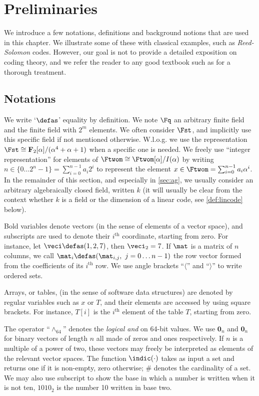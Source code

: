 \section{Preliminaries}
\label{not}

We introduce a few notations, definitions and background notions that are used in this chapter. We illustrate some of these with classical examples, such as \emph{Reed-Solomon} codes. However,
our goal is not to provide a detailed exposition on coding theory, and we refer the reader to any good textbook such as \cite{vanlint} for a thorough treatment.

\subsection{Notations}
We write `$\defas$' equality by definition.
We note $\Fq$ an arbitrary finite field and \Ftwom the finite field with $2^m$ elements. We often consider $\Fst$, and implicitly use this specific field if not mentioned otherwise.
W.l.o.g. we use the representation
$\Fst \cong \mathbf{F}_2[\alpha]/(\alpha^4 + \alpha + 1)$ when a specific one is needed. We freely use ``integer representation'' for elements of $\Ftwom \cong \Ftwom[\alpha]/I(\alpha)$
by writing $n \in \{0\ldots2^n-1\} = \sum_{i = 0}^{n-1} a_i 2^i$ to represent the element
$x \in \Ftwom = \sum_{i = 0}^{n-1} a_i \alpha^i$. In the remainder of this section, and especially in \autoref{sec:ag}, we usually consider an arbitrary algebraically closed field, written $k$
(it will usually be clear from the context whether $k$ is a field or the dimension of a linear code, see \autoref{def:lincode} below).

Bold variables denote vectors (in the sense of elements of a vector space), and subscripts are used to denote their $i^\text{th}$ coordinate, starting from zero. For instance,
let $\veci \defas (1, 2, 7)$, then  $\veci_2 = 7$.
If $\mat$ is a matrix of $n$ columns, we call $\mat_i \defas (\mat_{i,j},~j = 0\ldots n - 1)$ the row vector formed from the coefficients of
its $i^\text{th}$ row.
We use angle brackets ``$\langle$'' and ``$\rangle$'' to write ordered sets.

Arrays, or tables, (in the sense of software data structures) are denoted by regular variables such as $x$ or $T$, and their elements are accessed by using square brackets.
For instance, $T[i]$ is the $i^\text{th}$ element of the table $T$, starting from zero.

The operator ``$\wedge_{64}$'' denotes the  \emph{logical and} on 64-bit values. We use $\mathbf{0}_{n}$ and $\mathbf{0}_n$ for binary vectors of length $n$ all made of
zeros and ones respectively. If $n$ is a multiple of a power of two, these vectors may freely be interpreted as elements of the relevant vector spaces.
The function $\indic(\cdot)$ takes as input a set and returns one if it is non-empty, zero otherwise; $\#$ denotes the cardinality of a set.
We may also use subscript to show the base in which a number is written when it is not ten, \eg $1010_2$ is the number 10 written in base two.

